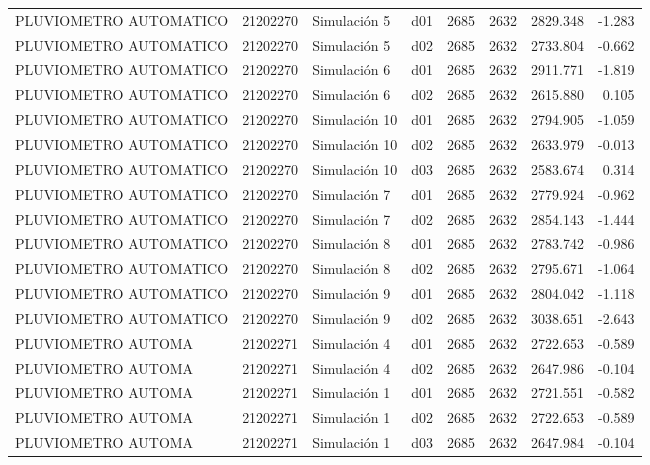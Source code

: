 \begin{landscape}
\begin{longtable}{lrlp{2cm}p{2cm}p{3cm}p{2cm}r}
  PLUVIOMETRO AUTOMATICO &  21202270 &   Simulación 5 &   d01 &      2685 &     2632 &  2829.348 &    -1.283 \\
  PLUVIOMETRO AUTOMATICO &  21202270 &   Simulación 5 &   d02 &      2685 &     2632 &  2733.804 &    -0.662 \\
  PLUVIOMETRO AUTOMATICO &  21202270 &   Simulación 6 &   d01 &      2685 &     2632 &  2911.771 &    -1.819 \\
  PLUVIOMETRO AUTOMATICO &  21202270 &   Simulación 6 &   d02 &      2685 &     2632 &  2615.880 &     0.105 \\
  PLUVIOMETRO AUTOMATICO &  21202270 &  Simulación 10 &   d01 &      2685 &     2632 &  2794.905 &    -1.059 \\
  PLUVIOMETRO AUTOMATICO &  21202270 &  Simulación 10 &   d02 &      2685 &     2632 &  2633.979 &    -0.013 \\
  PLUVIOMETRO AUTOMATICO &  21202270 &  Simulación 10 &   d03 &      2685 &     2632 &  2583.674 &     0.314 \\
  PLUVIOMETRO AUTOMATICO &  21202270 &   Simulación 7 &   d01 &      2685 &     2632 &  2779.924 &    -0.962 \\
  PLUVIOMETRO AUTOMATICO &  21202270 &   Simulación 7 &   d02 &      2685 &     2632 &  2854.143 &    -1.444 \\
  PLUVIOMETRO AUTOMATICO &  21202270 &   Simulación 8 &   d01 &      2685 &     2632 &  2783.742 &    -0.986 \\
  PLUVIOMETRO AUTOMATICO &  21202270 &   Simulación 8 &   d02 &      2685 &     2632 &  2795.671 &    -1.064 \\
  PLUVIOMETRO AUTOMATICO &  21202270 &   Simulación 9 &   d01 &      2685 &     2632 &  2804.042 &    -1.118 \\
  PLUVIOMETRO AUTOMATICO &  21202270 &   Simulación 9 &   d02 &      2685 &     2632 &  3038.651 &    -2.643 \\
      PLUVIOMETRO AUTOMA &  21202271 &   Simulación 4 &   d01 &      2685 &     2632 &  2722.653 &    -0.589 \\
      PLUVIOMETRO AUTOMA &  21202271 &   Simulación 4 &   d02 &      2685 &     2632 &  2647.986 &    -0.104 \\
      PLUVIOMETRO AUTOMA &  21202271 &   Simulación 1 &   d01 &      2685 &     2632 &  2721.551 &    -0.582 \\
      PLUVIOMETRO AUTOMA &  21202271 &   Simulación 1 &   d02 &      2685 &     2632 &  2722.653 &    -0.589 \\
      PLUVIOMETRO AUTOMA &  21202271 &   Simulación 1 &   d03 &      2685 &     2632 &  2647.984 &    -0.104 \\

\end{longtable}
\end{landscape}
